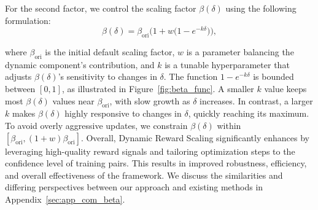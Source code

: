 For the second factor, we control the scaling factor $\beta(\delta)$ using the following formulation:
\[
\beta(\delta) = \beta_{\text{ori}} \Big( 1 + w \big( 1 - e^{-k \delta} \big) \Big),
\]

where $\beta_{\text{ori}}$ is the initial default scaling factor, $w$ is a parameter balancing the dynamic component's contribution, and $k$ is a tunable hyperparameter that adjusts $\beta(\delta)$'s sensitivity to changes in $\delta$. The function $1 - e^{-k \delta}$ is bounded between $[0, 1]$, {as illustrated in Figure~\ref{fig:beta_func}}. A smaller $k$ value keeps most $\beta(\delta)$ values near $\beta_{\text{ori}}$, with slow growth as $\delta$ increases. In contrast, a larger $k$ makes $\beta(\delta)$ highly responsive to changes in $\delta$, quickly reaching its maximum. To avoid overly aggressive updates, we constrain $\beta(\delta)$ within $[\beta_{\text{ori}}, (1 + w) \beta_{\text{ori}}]$. Overall, Dynamic Reward Scaling significantly enhances \dpo by leveraging high-quality reward signals and tailoring optimization steps to the confidence level of training pairs. This results in improved robustness, efficiency, and overall effectiveness of the framework. We discuss the similarities and differing perspectives between our approach and existing methods in Appendix~\ref{sec:app_com_beta}.
